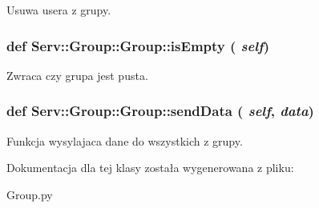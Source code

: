 \label{class_serv_1_1_group_1_1_group_a48768b6b5440e56d42d632085b2a8aef}
\begin{DoxyVerb}Usuwa usera z grupy.\end{DoxyVerb}
 \hypertarget{class_serv_1_1_group_1_1_group_a51e7ce8393ee398260d4e12e904da5ab}{
\subsubsection[{isEmpty}]{\setlength{\rightskip}{0pt plus 5cm}def Serv::Group::Group::isEmpty ( {\em self})}}
\label{class_serv_1_1_group_1_1_group_a51e7ce8393ee398260d4e12e904da5ab}
\begin{DoxyVerb}Zwraca czy grupa jest pusta.\end{DoxyVerb}
 \hypertarget{class_serv_1_1_group_1_1_group_acbb0137781676208d4de16b90d8d9cc0}{
\subsubsection[{sendData}]{\setlength{\rightskip}{0pt plus 5cm}def Serv::Group::Group::sendData ( {\em self}, \/   {\em data})}}
\label{class_serv_1_1_group_1_1_group_acbb0137781676208d4de16b90d8d9cc0}
\begin{DoxyVerb}Funkcja wysylajaca dane do wszystkich z grupy.\end{DoxyVerb}
 

Dokumentacja dla tej klasy została wygenerowana z pliku:\begin{DoxyCompactItemize}
\item 
Group.py\end{DoxyCompactItemize}

